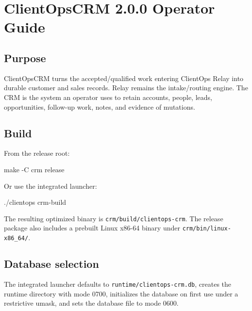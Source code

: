 \documentclass[
]{article}
\author{}
\date{}
\newenvironment{Shaded}{}{}
\newcommand{\AttributeTok}[1]{\textcolor[rgb]{0.49,0.56,0.16}{#1}}
\newcommand{\ExtensionTok}[1]{#1}
\newcommand{\FunctionTok}[1]{\textcolor[rgb]{0.02,0.16,0.49}{#1}}
\newcommand{\NormalTok}[1]{#1}
\begin{document}
\section{ClientOpsCRM 2.0.0 Operator
Guide}\label{clientopscrm-200-operator-guide}

\subsection{Purpose}\label{purpose}

ClientOpsCRM turns the accepted/qualified work entering ClientOps Relay
into durable customer and sales records. Relay remains the
intake/routing engine. The CRM is the system an operator uses to retain
accounts, people, leads, opportunities, follow-up work, notes, and
evidence of mutations.

\subsection{Build}\label{build}

From the release root:

\begin{Shaded}
\begin{Highlighting}[]
\FunctionTok{make} \AttributeTok{{-}C}\NormalTok{ crm release}
\end{Highlighting}
\end{Shaded}

Or use the integrated launcher:

\begin{Shaded}
\begin{Highlighting}[]
\ExtensionTok{./clientops}\NormalTok{ crm{-}build}
\end{Highlighting}
\end{Shaded}

The resulting optimized binary is \texttt{crm/build/clientops-crm}. The
release package also includes a prebuilt Linux x86-64 binary under
\texttt{crm/bin/linux-x86\_64/}.

\subsection{Database selection}\label{database-selection}

The integrated launcher defaults to \texttt{runtime/clientops-crm.db},
creates the runtime directory with mode 0700, initializes the database
on first use under a restrictive umask, and sets the database file to
mode 0600.
\end{document}

